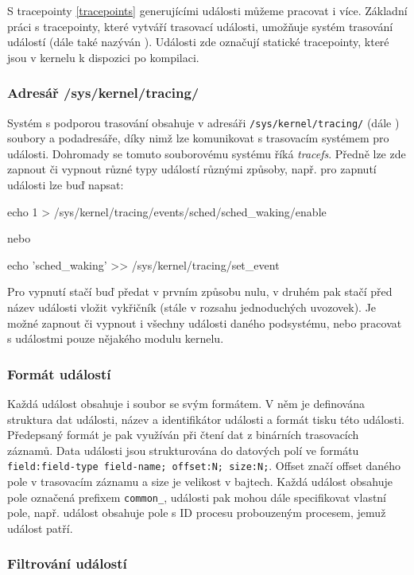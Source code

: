 S tracepointy \ref{tracepoints} generujícími události můžeme pracovat i více. Základní práci s tracepointy, které vytváří trasovací události, umožňuje systém trasování událostí (dále také nazýván ). Události zde označují statické tracepointy, které jsou v kernelu k dispozici po kompilaci.

\subsubsection*{Adresář /sys/kernel/tracing/}
Systém s podporou trasování obsahuje v adresáři \texttt{/sys/kernel/tracing/} (dále ) soubory a podadresáře, díky nimž lze komunikovat s trasovacím systémem pro události. Dohromady se tomuto souborovému systému říká \emph{tracefs}. Předně lze zde zapnout či vypnout různé typy událostí různými způsoby, např. pro zapnutí události  lze buď napsat:
\begin{code}
    echo 1 > /sys/kernel/tracing/events/sched/sched_waking/enable
\end{code}
nebo
\begin{code}
    echo 'sched_waking' >> /sys/kernel/tracing/set\_event
\end{code}
Pro vypnutí stačí buď předat v prvním způsobu nulu, v druhém pak stačí před název události vložit vykřičník (stále v rozsahu jednoduchých uvozovek). Je možné zapnout či vypnout i všechny události daného podsystému, nebo pracovat s událostmi pouze nějakého modulu kernelu. 

\subsubsection*{Formát událostí}
Každá událost obsahuje i soubor se svým formátem. V něm je definována struktura dat události, název a identifikátor události a formát tisku této události. Předepsaný formát je pak využíván při čtení dat z binárních trasovacích záznamů. Data události jsou strukturována do datových polí ve formátu \texttt{field:field-type field-name; offset:N; size:N;}. Offset značí offset daného pole v trasovacím záznamu a size je velikost v bajtech. Každá událost obsahuje pole označená prefixem \texttt{common\_}, události pak mohou dále specifikovat vlastní pole, např. událost  obsahuje pole s ID procesu probouzeným procesem, jemuž událost patří.

\subsubsection*{Filtrování událostí}


